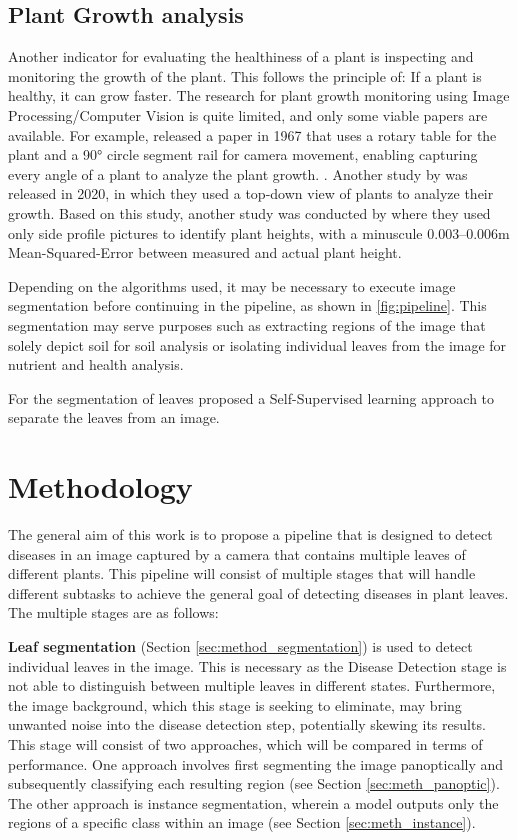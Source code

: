 \documentclass[draft,final]{vutinfth} %
\begin{document}
\section{Plant Growth analysis} \label{sec:plant_growth_analysis}
Another indicator for evaluating the healthiness of a plant is inspecting and monitoring the growth of the plant. This follows the principle of: If a plant is healthy, it can grow faster.
The research for plant growth monitoring using Image Processing/Computer Vision is quite limited, and only some viable papers are available. For example, \citeauthor{matsui_computer_1976} released a paper in 1967 that uses a rotary table for the plant and a 90° circle segment rail for camera movement, enabling capturing every angle of a plant to analyze the plant growth. \cite{matsui_computer_1976}. Another study by \citeauthor{li_measuring_2020} was released in 2020, in which they used a top-down view of plants to analyze their growth. \cite{li_measuring_2020}
Based on this study, another study was conducted by \citeauthor{gupta_image_2022} where they used only side profile pictures to identify plant heights, with a minuscule 0.003–0.006m Mean-Squared-Error between measured and actual plant height. \cite{gupta_image_2022}

Depending on the algorithms used, it may be necessary to execute image segmentation before continuing in the pipeline, as shown in \ref{fig:pipeline}. This segmentation may serve purposes such as extracting regions of the image that solely depict soil for soil analysis or isolating individual leaves from the image for nutrient and health analysis.

For the segmentation of leaves \citeauthor{lin_self-supervised_2023} proposed a Self-Supervised learning approach to separate the leaves from an image. \cite{lin_self-supervised_2023}

\chapter{Methodology}

The general aim of this work is to propose a pipeline that is designed to detect diseases in an image captured by a camera that contains multiple leaves of different plants.
This pipeline will consist of multiple stages that will handle different subtasks to achieve the general goal of detecting diseases in plant leaves. The multiple stages are as follows:

\textbf{Leaf segmentation} (Section \ref{sec:method_segmentation}) is used to detect individual leaves in the image. This is necessary as the Disease Detection stage is not able to distinguish between multiple leaves in different states. Furthermore, the image background, which this stage is seeking to eliminate, may bring unwanted noise into the disease detection step, potentially skewing its results. This stage will consist of two approaches, which will be compared in terms of performance. One approach involves first segmenting the image panoptically and subsequently classifying each resulting region (see Section \ref{sec:meth_panoptic}). The other approach is instance segmentation, wherein a model outputs only the regions of a specific class within an image (see Section \ref{sec:meth_instance}).
\end{document}
